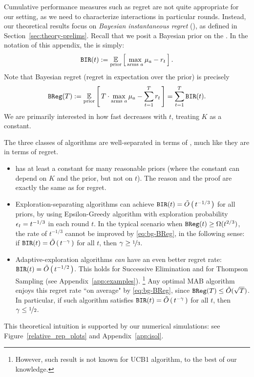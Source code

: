 Cumulative performance measures such as regret are not quite appropriate for our setting, as we need to characterize interactions in particular rounds. Instead, our theoretical results focus on \emph{Bayesian instantaneous regret} (\BIR), as defined in Section~\ref{sec:theory-prelims}. Recall that we posit a Bayesian prior on the \MRVs. In the notation of this appendix, the \BIR is simply:
\begin{align*}%
\BIR(t) := \E_{\text{prior}}\sbr{ \max_{\text{arms $a$}} \mu_a - r_t}.
\end{align*}
\noindent Note that Bayesian regret (\ie regret in expectation over the prior) is precisely
\begin{align}\label{eq:bg-BReg}
  \BReg(T):=
    \E_{\text{prior}}\sbr{ T\cdot \max_{\text{arms $a$}}\mu_a - \sum_{t=1}^T r_t }
    = \sum_{t=1}^T \BIR(t).
\end{align}
We are primarily interested in how fast \BIR decreases with $t$, treating $K$ as a constant.


The three classes of algorithms are well-separated in terms of \BIR, much like they are in terms of regret.
\begin{itemize}
\item \DynGreedy has at least a constant \BIR for many reasonable priors (where the constant can depend on $K$ and the prior, but not on $t$). The reason and the proof are exactly the same as for regret.

\item Exploration-separating algorithms can achieve
    $\mathtt{BIR}(t) = \tilde{O}\left(\,t^{-1/3}\,\right)$
for all priors, \eg by using Epsilon-Greedy algorithm with exploration probability $\epsilon_t = t^{-1/3}$ in each round $t$.
In the typical scenario when
 $\mathtt{BReg}(t)\geq \Omega(t^{2/3})$,
the \BIR rate of $t^{-1/3}$  cannot be improved by \eqref{eq:bg-BReg}, in the following sense:
if
    $\mathtt{BIR}(t) = \tilde{O}\left(\,t^{-\gamma}\,\right)$
for all $t$, then $\gamma\geq \nicefrac{1}{3}$.

\item Adaptive-exploration algorithms \emph{can} have an even better regret rate: $\mathtt{BIR}(t) = \tilde{O}\left(\, t^{-1/2} \,\right) $. This holds for Successive Elimination \citep{EvenDar-icml06} and for Thompson Sampling (see Appendix~\ref{app:examples}).%
    \footnote{However, such result is not known for UCB1 algorithm, to the best of our knowledge.}
    Any optimal MAB algorithm enjoys this regret rate ``on average" by \eqref{eq:bg-BReg}, since
        $\mathtt{BReg}(T)\leq \tilde{O}(\sqrt{T})$.
    In particular, if such algorithm satisfies
        $\mathtt{BIR}(t) = \tilde{O}\left(\,t^{-\gamma}\,\right)$
    for all $t$, then $\gamma \leq \nicefrac{1}{2}$.

\end{itemize}

\noindent This theoretical intuition is supported by our numerical simulations: see
Figure~\ref{relative_rep_plots} and Appendix~\ref{app:isol}.


